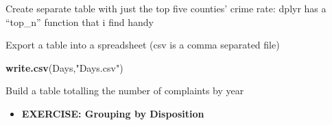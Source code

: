 \documentclass[]{book}
\newenvironment{Shaded}{\begin{snugshade}}{\end{snugshade}}
\newcommand{\DecValTok}[1]{\textcolor[rgb]{0.00,0.00,0.81}{#1}}
\newcommand{\KeywordTok}[1]{\textcolor[rgb]{0.13,0.29,0.53}{\textbf{#1}}}
\newcommand{\NormalTok}[1]{#1}
\newcommand{\OperatorTok}[1]{\textcolor[rgb]{0.81,0.36,0.00}{\textbf{#1}}}
\newcommand{\StringTok}[1]{\textcolor[rgb]{0.31,0.60,0.02}{#1}}
\providecommand{\tightlist}{%
  \setlength{\itemsep}{0pt}\setlength{\parskip}{0pt}}
\begin{document}
\begin{Shaded}
\end{Shaded}

Create separate table with just the top five counties' crime rate: dplyr has a ``top\_n'' function that i find handy

\begin{Shaded}
\end{Shaded}

Export a table into a spreadsheet (csv is a comma separated file)

\begin{Shaded}
\begin{Highlighting}[]
\KeywordTok{write.csv}\NormalTok{(Days,}\StringTok{"Days.csv"}\NormalTok{)}
\end{Highlighting}
\end{Shaded}

Build a table totalling the number of complaints by year

\begin{Shaded}
\end{Shaded}

\begin{itemize}
\tightlist
\item
  \textbf{EXERCISE: Grouping by Disposition}
\end{itemize}
\end{document}
